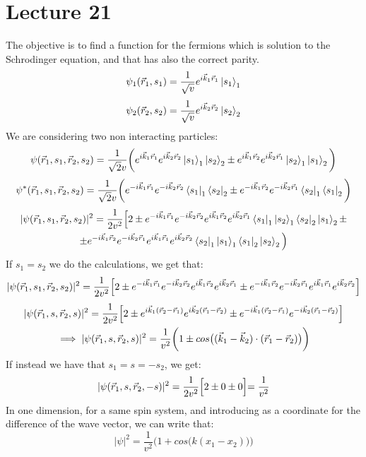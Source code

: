 \documentclass{article}
\begin{document}
\section{Lecture 21}
The objective is to find a function for the fermions which is solution to the Schrodinger equation, and that has also the correct parity.
$$\psi_1(\vec{r}_1,s_1) = \frac{1}{\sqrt{v}}e^{i \Vec{k}_1 \Vec{r}_1} \ket{s_1}_1$$
$$\psi_2(\vec{r}_2,s_2) = \frac{1}{\sqrt{v}}e^{i \Vec{k}_2 \Vec{r}_2} \ket{s_2}_2$$
We are considering two non interacting particles:
$$\psi(\vec{r}_1,s_1,\vec{r}_2,s_2) = \frac{1}{\sqrt{2}v} \biggl( e^{i \Vec{k}_1 \Vec{r}_1}e^{i \Vec{k}_2 \Vec{r}_2} \ket{s_1}_1\ket{s_2}_2 \pm e^{i \Vec{k}_1 \Vec{r}_2}e^{i \Vec{k}_2 \Vec{r}_1}  \ket{s_2}_1 \ket{s_1}_2 \biggl)$$
$$\psi^*(\vec{r}_1,s_1,\vec{r}_2,s_2) = \frac{1}{\sqrt{2}v} \biggl( e^{-i \Vec{k}_1 \Vec{r}_1}e^{-i \Vec{k}_2 \Vec{r}_2} \bra{s_1}_1\bra{s_2}_2 \pm e^{-i \Vec{k}_1 \Vec{r}_2}e^{-i \Vec{k}_2 \Vec{r}_1} \bra{s_2}_1 \bra{s_1}_2 \biggl)$$
\begin{gather*}
    |\psi(\vec{r}_1,s_1,\vec{r}_2,s_2) |^2 = \frac{1}{2v^2} \Bigl[2 \pm e^{-i \Vec{k}_1 \Vec{r}_1} e^{-i \Vec{k}_2 \Vec{r}_2} e^{i \Vec{k}_1 \Vec{r}_2}e^{i \Vec{k}_2 \Vec{r}_1}\bra{s_1}_1\ket{s_2}_1 \bra{s_2}_2  \ket{s_1}_2 \pm \\ \pm e^{-i \Vec{k}_1 \Vec{r}_2}e^{-i \Vec{k}_2 \Vec{r}_1}e^{i \Vec{k}_1 \Vec{r}_1} e^{i \Vec{k}_2 \Vec{r}_2} \bra{s_2}_1\ket{s_1}_1 \bra{s_1}_2\ket{s_2}_2 \Bigl)
\end{gather*}
If $s_1=s_2$ we do the calculations, we get that:
\begin{gather*}
|\psi(\vec{r}_1,s_1,\vec{r}_2,s_2) |^2  = \frac{1}{2v^2} \Bigl[2 \pm e^{-i \Vec{k}_1 \Vec{r}_1} e^{-i \Vec{k}_2 \Vec{r}_2} e^{i \Vec{k}_1 \Vec{r}_2}e^{i \Vec{k}_2 \Vec{r}_1} \pm e^{-i \Vec{k}_1 \Vec{r}_2}e^{-i \Vec{k}_2 \Vec{r}_1}e^{i \Vec{k}_1 \Vec{r}_1} e^{i \Vec{k}_2 \Vec{r}_2} \Bigl]
\end{gather*}
\begin{gather*}
    |\psi(\vec{r}_1,s,\vec{r}_2,s)|^2 = \frac{1}{2v^2} \Bigl[2 \pm e^{i\vec{k}_1(\Vec{r}_2-\vec{r}_1)} e^{i\vec{k}_2(\Vec{r}_1-\vec{r}_2)} \pm e^{-i\vec{k}_1(\Vec{r}_2-\vec{r}_1)} e^{-i\vec{k}_2(\Vec{r}_1-\vec{r}_2) }  \Bigl]  \\ \implies |\psi(\vec{r}_1,s,\vec{r}_2,s)|^2 = \frac{1}{v^2} \biggl( 1 \pm cos\bigl( (\vec{k}_1-\vec{k}_2) \cdot (\vec{r}_1-\vec{r}_2) \bigl) \biggl)
\end{gather*}
If instead we have that $s_1 =s = -s_2$, we get:
$$|\psi(\vec{r}_1,s,\vec{r}_2,-s)|^2 =\frac{1}{2v^2} \Bigl[ 2 \pm 0 \pm 0 \Bigl]= \frac{1}{v^2}  $$
In one dimension, for a same spin system, and introducing as a coordinate for the difference of the wave vector, we can write that:
$$ |\psi|^2 = \frac{1}{v^2} \biggl( 1 + cos\bigl(k(x_1-x_2)\bigl)\biggl) $$
\end{document}
